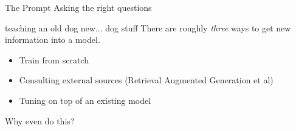 \documentclass[handout]{beamer} %
\begin{document}
\begin{frame}{The Prompt}
			Asking the right questions
\end{frame}

\begin{frame}[plain]
\end{frame}

\begin{frame}[plain]
\end{frame}


\begin{frame}{teaching an old dog new... dog stuff}
There are roughly \textit{three} ways to get new information into a model.
\begin{itemize}
	\pause
	\item Train from scratch
	\pause
	\item Consulting external sources (Retrieval Augmented Generation et al)
	\pause
	\item Tuning on top of an existing model
\end{itemize}
\end{frame}
	
	
	
\begin{frame}
	Why even do this?
\end{frame}
	
\end{document}
